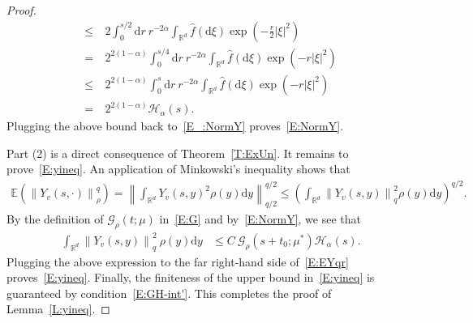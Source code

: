 \documentclass[sn-mathphys]{sn-jnl}%
\newcommand{\BR}{\mathbb{R}}
\newcommand{\E}{\mathbb{E}}
\newcommand{\Norm}[1]{\left\| #1 \right\|}
\newcommand{\ud}{\ensuremath{\mathrm{d}}}
\numberwithin{equation}{section}
\theoremstyle{thmstyleone}%
\theoremstyle{thmstyletwo}%
\theoremstyle{thmstylethree}%
\begin{document}
\begin{proof}
\begin{align*}
    \le & \: 2\int_0^{s/2} \ud r \: r^{-2\alpha}\int_{\BR^d} \widehat{f}(\ud \xi)\exp\left(-\frac{r}{2}\lvert\xi\rvert^2\right)      \\
    =   & \: 2^{2(1-\alpha)} \int_0^{s/4} \ud r \: r^{-2\alpha}\int_{\BR^d} \widehat{f}(\ud \xi)\exp\left(-r\lvert\xi\rvert^2\right) \\
    \le & \: 2^{2(1-\alpha)} \int_0^{s} \ud r \: r^{-2\alpha}\int_{\BR^d} \widehat{f}(\ud \xi)\exp\left(-r\lvert\xi\rvert^2\right)   \\
    =   & \: 2^{2(1-\alpha)} \mathcal{H}_\alpha(s).
  \end{align*}
  Plugging the above bound back to~\eqref{E_:NormY} proves~\eqref{E:NormY}. \bigskip

  Part (2) is a direct consequence of Theorem~\ref{T:ExUn}. It remains to prove~\eqref{E:yineq}. An
  application of Minkowski's inequality shows that
  \begin{align}\label{E:EYqr}
    \E\left(\Norm{Y_v(s,\cdot)}_{\rho}^q\right)
    = \Norm{\int_{\BR^d} Y_v(s,y)^2\rho(y) \ud y}_{q/2}^{q/2}
    \le \left(\int_{\BR^d} \Norm{Y_v(s,y)}_q^2\rho(y) \ud y\right)^{q/2}.
  \end{align}
  By the definition of $\mathcal{G}_{\rho}(t;\mu)$ in~\eqref{E:G} and by~\eqref{E:NormY}, we see
  that
  \begin{align*}
    \int_{\BR^d}\Norm{Y_v(s,y)}_q^2 \: \rho(y)\ud y
    & \le C \: \mathcal{G}_{\rho}(s + t_0;\mu^*) \mathcal{H}_\alpha(s).
  \end{align*}
  Plugging the above expression to the far right-hand side of~\eqref{E:EYqr} proves~\eqref{E:yineq}.
  Finally, the finiteness of the upper bound in~\eqref{E:yineq} is guaranteed by
  condition~\eqref{E:GH-int'}. This completes the proof of Lemma~\ref{L:yineq}.
\end{proof}
\end{document}
